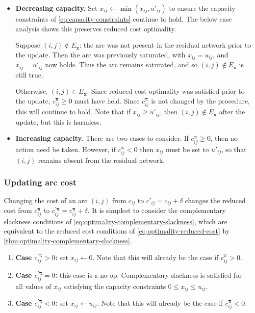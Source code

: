 \begin{itemize}
    \item \textbf{Decreasing capacity.} Set $x_{ij} \gets \min\left(x_{ij},u'_{ij}\right)$ to ensure the capacity constraints of \cref{eq:capacity-constraints} continue to hold\footnotemark. The below case analysis shows this preserves reduced cost optimality.
    
    Suppose $(i,j) \not \in E_\mathbf{x}$: the arc was not present in the residual network prior to the update. Then the arc was previously saturated, with $x_{ij} = u_{ij}$, and $x_{ij} = u'_{ij}$ now holds. Thus the arc remains saturated, and so $(i,j) \not \in E_\mathbf{x}$ is still true.
    
    Otherwise, $(i,j) \in E_\mathbf{x}$. Since reduced cost optimality was satisfied prior to the update, $c_{ij}^{\boldsymbol{\pi}} \geq 0$ must have held. Since $c_{ij}^{\boldsymbol{\pi}}$ is not changed by the procedure, this will continue to hold. Note that if $x_{ij} \geq u'_{ij}$, then $(i,j) \not \in E_\mathbf{x}$ after the update, but this is harmless.
    \item \textbf{Increasing capacity.} There are two cases to consider. If $c_{ij}^{\boldsymbol{\pi}} \geq 0$, then no action need be taken. However, if $c_{ij}^{\boldsymbol{\pi}} < 0$ then $x_{ij}$ must be set to $u'_{ij}$, so that $(i,j)$ remains absent from the residual network.
\end{itemize}

\subsubsection{Updating arc cost}

Changing the cost of an arc $(i,j)$ from $c_{ij}$ to $c'_{ij} = c_{ij} + \delta$ changes the reduced cost from $c_{ij}^{\boldsymbol{\pi}}$ to $c_{ij}^{\prime\boldsymbol{\pi}} = c_{ij}^{\boldsymbol{\pi}} + \delta$. It is simplest to consider the complementary slackness conditions of \cref{eq:optimality-complementary-slackness}, which are equivalent to the reduced cost conditions of \cref{eq:optimality-reduced-cost} by \cref{thm:optimality-complementary-slackness}.

\begin{enumerate}
    \item \textbf{Case $c_{ij}^{\prime\boldsymbol{\pi}} > 0$:} set $x_{ij} \gets 0$. Note that this will already be the case if $c_{ij}^{\boldsymbol{\pi}} > 0$.
    \item \textbf{Case $c_{ij}^{\prime\boldsymbol{\pi}} = 0$: } this case is a no-op. Complementary slackness is satisfied for all values of $x_{ij}$ satisfying the capacity constraints $0 \leq x_{ij} \leq u_{ij}$.
    \item \textbf{Case $c_{ij}^{\prime\boldsymbol{\pi}} < 0$: } set $x_{ij} \gets u_{ij}$. Note that this will already be the case if $c_{ij}^{\boldsymbol{\pi}} < 0$.
\end{enumerate}

